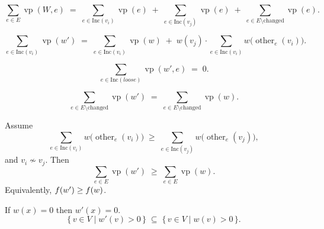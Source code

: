 \begin{lemma}\label{lem:Improve-sum-split}
\[
  \sum_{e\in E}\operatorname{vp}(W,e)
  \;=\;
  \sum_{e\in \mathrm{Inc}(v_i)}\operatorname{vp}(e)
  \;+\;
  \sum_{e\in \mathrm{Inc}(v_j)}\operatorname{vp}(e)
  \;+\;
  \sum_{e\in E\setminus \mathrm{changed}}\operatorname{vp}(e).
\]
\leanok
{}
\end{lemma}

\begin{lemma}\label{lem:Improve-gain-increase}
\[
  \sum_{e\in \mathrm{Inc}(v_i)}\operatorname{vp}(w')
  \;=\;
  \sum_{e\in \mathrm{Inc}(v_i)}\operatorname{vp}(w)
  \;+\;
  w(v_j) \cdot
  \sum_{e\in \mathrm{Inc}(v_i)}
  w\!\bigl(\operatorname{other}_e(v_i)\bigr).
\]
\leanok
{}
\end{lemma}

\begin{lemma}\label{lem:Improve-loose-zero-sum}
\[
  \sum_{e\in \mathrm{Inc}(\textit{loose})}\operatorname{vp}(w',e) \;=\; 0.
\]
\leanok
{}
\end{lemma}

\begin{lemma}\label{lem:Improve-unchanged-outside}
\[
  \sum_{e\in E\setminus \mathrm{changed}}\operatorname{vp}(w')
  \;=\;
  \sum_{e\in E\setminus \mathrm{changed}}\operatorname{vp}(w).
\]
\leanok
{}
\end{lemma}

\begin{lemma}\label{lem:Improve-monotone}
Assume
\[
  \sum_{e\in \mathrm{Inc}(v_i)}
    w\!\bigl(\operatorname{other}_e(v_i)\bigr)
  \;\ge\;
  \sum_{e\in \mathrm{Inc}(v_j)}
    w\!\bigl(\operatorname{other}_e(v_j)\bigr),
\]
and $v_i\not\sim v_j$. Then
\[
  \sum_{e\in E}\operatorname{vp}(w')
  \;\ge\;
  \sum_{e\in E}\operatorname{vp}(w).
\]
Equivalently, $f(w')\ge f(w)$.
\leanok
{}
\end{lemma}

\begin{lemma}\label{lem:Improve-zeros-stay-zero}
If $w(x)=0$ then $w'(x)=0$. 
\[
  \{\,v\in V\mid w'(v)>0\,\}\;\subseteq\;
  \{\,v\in V\mid w(v)>0\,\}.
\]
\leanok
{}
\end{lemma}

